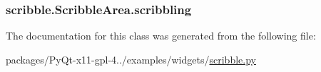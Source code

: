 \subsubsection[{scribbling}]{\setlength{\rightskip}{0pt plus 5cm}scribble.\+Scribble\+Area.\+scribbling}\label{classscribble_1_1ScribbleArea_af01432f51efb8695225a1dc1ee718ba0}


The documentation for this class was generated from the following file\+:\begin{DoxyCompactItemize}
\item 
packages/\+Py\+Qt-\/x11-\/gpl-\/4../examples/widgets/\hyperlink{scribble_8py}{scribble.\+py}\end{DoxyCompactItemize}
